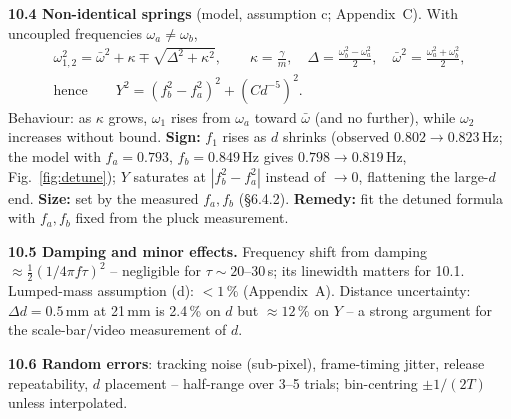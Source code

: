 \documentclass[11pt,a4paper]{article}
\newcommand{\Y}{Y}                       %
\newcommand{\sign}[1]{\textbf{Sign:} #1}
\newcommand{\size}[1]{\textbf{Size:} #1}
\newcommand{\remedy}[1]{\textbf{Remedy:} #1}
\begin{document}
\textbf{10.4 Non-identical springs} (model, assumption c; Appendix~C). With uncoupled
frequencies $\omega_a\neq\omega_b$,
\begin{gather}
  \omega_{1,2}^2=\bar\omega^2+\kappa\mp\sqrt{\Delta^2+\kappa^2},\qquad
  \kappa=\frac{\gamma}{m},\quad \Delta=\frac{\omega_b^2-\omega_a^2}{2},\quad
  \bar\omega^2=\frac{\omega_a^2+\omega_b^2}{2},\\
  \text{hence}\qquad \Y^2=(f_b^2-f_a^2)^2+(C d^{-5})^2 .
\end{gather}
Behaviour: as $\kappa$ grows, $\omega_1$ rises from $\omega_a$ toward $\bar\omega$ (and no
further), while $\omega_2$ increases without bound. \sign{$f_1$ rises as $d$ shrinks
(observed $0.802\to0.823$\,Hz; the model with $f_a=0.793$, $f_b=0.849$\,Hz gives
$0.798\to0.819$\,Hz, Fig.~\ref{fig:detune}); $\Y$ saturates at $|f_b^2-f_a^2|$ instead of
$\to0$, flattening the large-$d$ end.} \size{set by the measured $f_a,f_b$ (\S6.4.2).}
\remedy{fit the detuned formula with $f_a,f_b$ fixed from the pluck measurement.}

\textbf{10.5 Damping and minor effects.} Frequency shift from damping
$\approx\tfrac12(1/4\pi f\tau)^2$ -- negligible for $\tau\sim20$--30\,s; its linewidth
matters for 10.1. Lumped-mass assumption (d): $<1\,\%$ (Appendix~A). Distance uncertainty:
$\Delta d=0.5$\,mm at 21\,mm is 2.4\,\% on $d$ but $\approx12\,\%$ on $\Y$ -- a strong
argument for the scale-bar/video measurement of $d$.

\textbf{10.6 Random errors}: tracking noise (sub-pixel), frame-timing jitter, release
repeatability, $d$ placement -- half-range over 3--5 trials; bin-centring $\pm1/(2T)$
unless interpolated.
\end{document}
